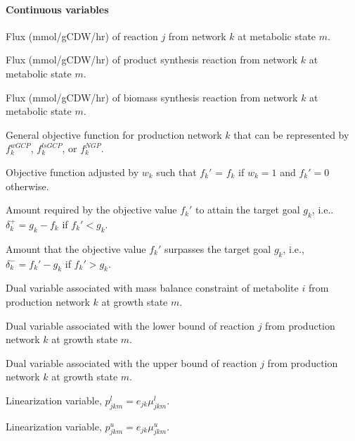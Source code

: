 \paragraph{Continuous variables}
\begin{description}[leftmargin=1.5cm, style=nextline, itemindent=-10pt]
\item[$v_{jkm}$] Flux (mmol/gCDW/hr) of reaction $j$ from network $k$ at metabolic state $m$.
\item[$v_{Pkm}$] Flux (mmol/gCDW/hr) of product synthesis reaction from network $k$ at metabolic state $m$.
\item[$v_{Xkm}$] Flux (mmol/gCDW/hr) of biomass synthesis reaction from network $k$ at metabolic state $m$.
\item[$f_k$] General objective function for production network $k$ that can be represented by $f_k^{wGCP}$, $f_k^{lsGCP}$, or $f_k^{NGP}$.
\item[$f_k'$] Objective function adjusted by $w_k$ such that $f_k'$ = $f_k$ if $w_k=1$ and $f_k'=0$ otherwise.
\item[$\delta_k^+$] Amount required by the objective value $f_k'$ to attain the target goal $g_k$,  i.e.. $\delta_k^+ = g_k - f_k$ if $f_k' < g_k$.
\item[$\delta_k^-$] Amount that the objective value $f_k'$ surpasses the target goal $g_k$, i.e., $\delta_k^- = f_k' - g_k$ if $f_k' > g_k$.
\item[$\lambda_{ikm}$] Dual variable associated with mass balance constraint of metabolite $i$ from production network $k$ at growth state $m$.
\item[$\mu_{jkm}^{l}$] Dual variable  associated with the lower bound of reaction $j$ from production network $k$ at growth state $m$.
\item[$\mu_{jkm}^{u}$] Dual variable  associated with the upper bound of reaction $j$ from production network  $k$ at growth state $m$.
\item[$p_{jkm}^{l}$] Linearization variable, $p_{jkm}^{l}=e_{jk} \mu^{l}_{jkm}$.
\item[$p_{jkm}^{u}$] Linearization variable, $p_{jkm}^{u}=e_{jk} \mu^{u}_{jkm}$.
\end{description}

